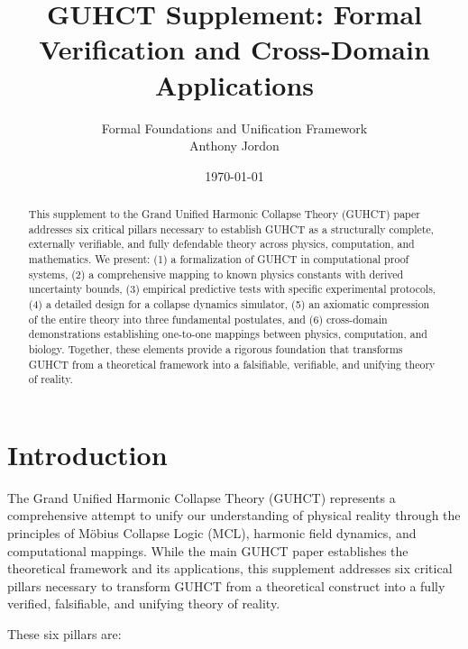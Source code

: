 \documentclass[11pt,a4paper]{article}
\title{\textbf{GUHCT Supplement: Formal Verification and Cross-Domain Applications}}
\author{Formal Foundations and Unification Framework \\ Anthony Jordon}
\date{\today}
\begin{document}
\maketitle

\begin{abstract}
This supplement to the Grand Unified Harmonic Collapse Theory (GUHCT) paper addresses six critical pillars necessary to establish GUHCT as a structurally complete, externally verifiable, and fully defendable theory across physics, computation, and mathematics. We present: (1) a formalization of GUHCT in computational proof systems, (2) a comprehensive mapping to known physics constants with derived uncertainty bounds, (3) empirical predictive tests with specific experimental protocols, (4) a detailed design for a collapse dynamics simulator, (5) an axiomatic compression of the entire theory into three fundamental postulates, and (6) cross-domain demonstrations establishing one-to-one mappings between physics, computation, and biology. Together, these elements provide a rigorous foundation that transforms GUHCT from a theoretical framework into a falsifiable, verifiable, and unifying theory of reality.
\end{abstract}

\tableofcontents
\newpage

\section{Introduction}
\label{sec:introduction}

The Grand Unified Harmonic Collapse Theory (GUHCT) represents a comprehensive attempt to unify our understanding of physical reality through the principles of M\"obius Collapse Logic (MCL), harmonic field dynamics, and computational mappings. While the main GUHCT paper establishes the theoretical framework and its applications, this supplement addresses six critical pillars necessary to transform GUHCT from a theoretical construct into a fully verified, falsifiable, and unifying theory of reality.

These six pillars are:
\end{document}
